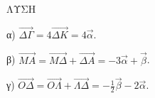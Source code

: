 \noindent ΛΥΣΗ

\vspace{1em} %

α) $\vec{\Delta\Gamma} = 4\vec{\Delta K} = 4\vec{\alpha}$.

β) $\vec{MA} = \vec{M\Delta} + \vec{\Delta A} = -3\vec{\alpha} + \vec{\beta}$.

γ) $\vec{O\Delta} = \vec{O\Lambda} + \vec{\Lambda\Delta} = -\frac{1}{2}\vec{\beta} - 2\vec{\alpha}$.

